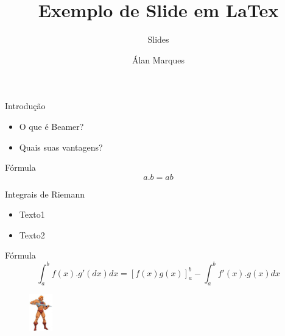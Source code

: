 \documentclass[12pt]{beamer}
\author{Álan Marques}
\title{Exemplo de Slide em LaTex}
\subtitle{Slides}
\institute{Universidade Estadual do Norte do Paraná}
\begin{document}
\begin{frame}
	\titlepage
\end{frame}

\begin{frame}{Introdução}
	\begin{itemize}
\item O que é Beamer?
\item Quais suas vantagens?
	
	\end{itemize}
\end{frame}





\begin{frame}
	\begin{block}{Fórmula}
	\begin{equation}
		a.b = ab
	\end{equation}
	\end{block}
\end{frame}

\begin{frame}{Integrais de Riemann}
\begin{itemize}
	\item Texto1
	\item Texto2
\end{itemize}

	\begin{block}{Fórmula}
	\begin{equation}
		\int^b_a f(x).g'(dx)dx = [f(x)g(x)]^b_a - \int^b_a f'(x).g(x)dx
	\end{equation}
	\end{block}
\begin{figure}[h]
	\begin{flushright}
		\includegraphics[width=1cm]{heman.png}
	\end{flushright}
	\end{figure}
	
\end{frame}
\end{document}
